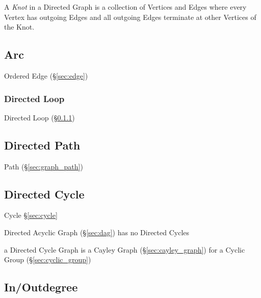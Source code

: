 A \emph{Knot} in a Directed Graph is a collection of Vertices and
Edges where every Vertex has outgoing Edges and all outgoing Edges
terminate at other Vertices of the Knot.



\subsection{Arc}\label{sec:arc}

Ordered Edge (\S\ref{sec:edge})



\subsubsection{Directed Loop}\label{sec:directed_loop}

Directed Loop (\S\ref{sec:directed_loop})



\subsection{Directed Path}\label{sec:directed_path}

Path (\S\ref{sec:graph_path})



\subsection{Directed Cycle}\label{sec:directed_cycle}

Cycle \S\ref{sec:cycle}

Directed Acyclic Graph (\S\ref{sec:dag}) has no Directed Cycles

a Directed Cycle Graph is a Cayley Graph (\S\ref{sec:cayley_graph})
for a Cyclic Group (\S\ref{sec:cyclic_group})



\subsection{In/Outdegree}\label{sec:inoutdegree}

